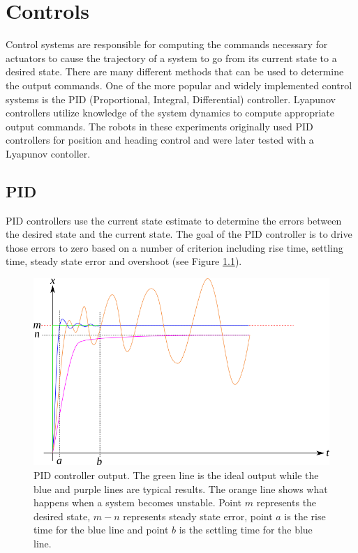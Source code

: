 \chapter{Controls}
\label{ch:controls}
Control systems are responsible for computing the commands necessary for actuators to cause the trajectory of a system to go from its current state to a desired state. There are many different methods that can be used to determine the output commands. One of the more popular and widely implemented control systems is the PID (Proportional, Integral, Differential) controller. Lyapunov controllers utilize knowledge of the system dynamics to compute appropriate output commands. The robots in these experiments originally used PID controllers for position and heading control and were later tested with a Lyapunov contoller.

\section{PID}
\label{sec:pid}
PID controllers use the current state estimate to determine the errors between the desired state and the current state. The goal of the PID controller is to drive those errors to zero based on a number of criterion including rise time, settling time, steady state error and overshoot (see Figure \ref{fig:pid}).

\begin{figure}[ht!]
	\centering
	\includegraphics[width=.85\textwidth]{images/pid}
	\caption{PID controller output. The green line is the ideal output while the blue and purple lines are typical results. The orange line shows what happens when a system becomes unstable. Point $m$ represents the desired state, $m-n$ represents steady state error, point $a$ is the rise time for the blue line and point $b$ is the settling time for the blue line.}
	\label{fig:pid}
\end{figure}

